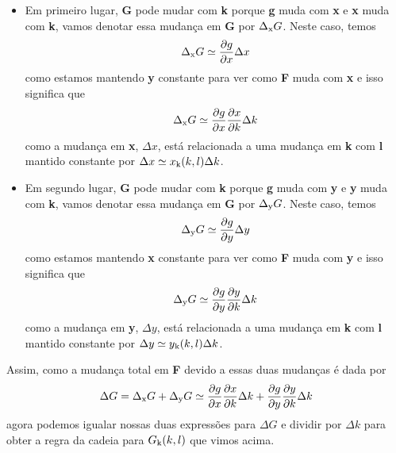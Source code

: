 \documentclass[a4paper]{article}
\begin{document}
\begin{itemize}
    \item Em primeiro lugar, \textbf{G} pode mudar com \textbf{k} porque \textbf{g} muda com \textbf{x} e \textbf{x} muda com \textbf{k}, vamos denotar essa mudança em \textbf{G} por $\Delta \textsubscript{x}G$. Neste caso, temos
    \begin{equation}
        \Delta \textsubscript{x}G \simeq \frac{\partial g}{\partial x}\Delta x
    \end{equation}
    como estamos mantendo \textbf{y} constante para ver como \textbf{F} muda com \textbf{x} e isso significa que
    \begin{equation}
        \Delta \textsubscript{x}G \simeq \frac{\partial g}{\partial x} \frac{\partial x}{\partial k}\Delta k
    \end{equation}
    como a mudança em \textbf{x}, \textbf{$\Delta x$}, está relacionada a uma mudança em \textbf{k} com \textbf{l} mantido constante por $\Delta x \simeq x\textsubscript{k}(k,l)\Delta k$.
    \item Em segundo lugar, \textbf{G} pode mudar com \textbf{k} porque \textbf{g} muda com \textbf{y} e \textbf{y} muda com \textbf{k}, vamos denotar essa mudança em \textbf{G} por $\Delta \textsubscript{y}G$. Neste caso, temos
    \begin{equation}
        \Delta \textsubscript{y}G \simeq \frac{\partial g}{\partial y}\Delta y
    \end{equation}
    como estamos mantendo \textbf{x} constante para ver como \textbf{F} muda com \textbf{y} e isso significa que
    \begin{equation}
        \Delta \textsubscript{y}G \simeq \frac{\partial g}{\partial y} \frac{\partial y}{\partial k}\Delta k
    \end{equation}
    como a mudança em \textbf{y}, \textbf{$\Delta y$}, está relacionada a uma mudança em \textbf{k} com \textbf{l} mantido constante por $\Delta y \simeq y\textsubscript{k}(k,l)\Delta k$.
\end{itemize}
\par Assim, como a mudança total em \textbf{F} devido a essas duas mudanças é dada por
\begin{equation}
    \Delta G = \Delta\textsubscript{x}G + \Delta\textsubscript{y}G \simeq \frac{\partial g}{\partial x}\frac{\partial x}{\partial k}\Delta k + \frac{\partial g}{\partial y}\frac{\partial y}{\partial k}\Delta k
\end{equation}
agora podemos igualar nossas duas expressões para $\Delta G$ e dividir por $\Delta k$ para obter a regra da cadeia para $G\textsubscript{k}(k,l)$ que vimos acima.
\end{document}
